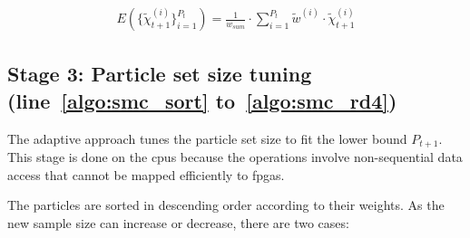 \begin{equation}
\begin{aligned}
E(\{\widetilde{\chi}_{t+1}^{(i)}\}^{P_t}_{i=1}) = \frac{1}{w_{sum}} \cdot \sum_{i=1}^{P_{t}} \widetilde{w}^{(i)} \cdot \widetilde{\chi}_{t+1}^{(i)}
\end{aligned}
\label{eqt:bound8}
\end{equation}

\subsection[Stage 3: Particle set size tuning]{Stage 3: Particle set size tuning (line~\ref{algo:smc_sort} to~\ref{algo:smc_rd4})} 
The adaptive approach tunes the particle set size to fit the lower bound $P_{t+1}$.
This stage is done on the \gls{cpu}s because the operations involve non-sequential data access that cannot be mapped efficiently to \gls{fpga}s.

The particles are sorted in descending order according to their weights.
As the new sample size can increase or decrease, there are two cases:

